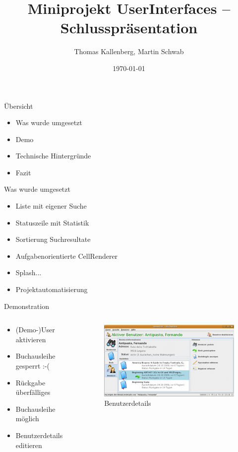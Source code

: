 \documentclass[]{beamer}
\title{Miniprojekt UserInterfaces -- Schlusspräsentation}
\author{Thomas Kallenberg, Martin Schwab}
\institute{HSR Hochschule Rapperswil}
\date{ \today }
\begin{document}
\begin{frame}
  \titlepage
\end{frame}

\begin{frame}{Übersicht}
\begin{itemize}
\item Was wurde umgesetzt
\item Demo
\item Technische Hintergründe
\item Fazit
\end{itemize}
\end{frame}

\begin{frame}{Was wurde umgesetzt}
 \begin{itemize}
   \item Liste mit eigener Suche
   \item Statuszeile mit Statistik
   \item Sortierung Suchresultate
   \item Aufgabenorientierte CellRenderer
   \item Splash...
   \item Projektautomatisierung
 \end{itemize}
\end{frame}

\begin{frame}{Demonstration}
\begin{columns}[t]
  \begin{column}{5cm}
   \begin{itemize}
    \item (Demo-)User aktivieren
    \item Buchausleihe gesperrt :-(
    \item Rückgabe überfälliges
    \item Buchausleihe möglich
    \item Benutzerdetails editieren
   \end{itemize}
  \end{column}
  \begin{column}{5cm}
   \begin{figure}
     \includegraphics[scale=0.4]{screen}
     \caption{Benutzerdetails}
   \end{figure}
  \end{column}
\end{columns}
\end{frame}
\end{document}
